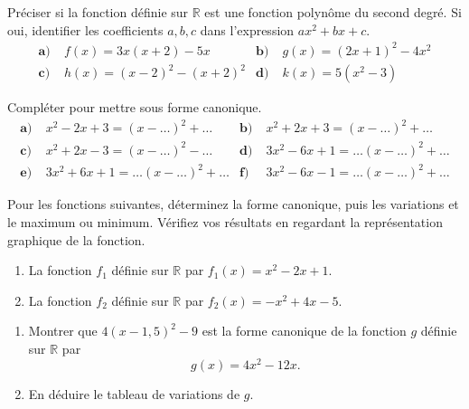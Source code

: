 \documentclass[11pt]{article}
\begin{document}
\begin{exo}
  Préciser si la fonction définie sur $\mathbb{R}$ est une fonction polynôme du
  second degré. Si oui, identifier les coefficients $a, b, c$ dans l'expression
  $ax^2+bx+c$.
  \begin{align*}
    \textbf{a)}&\; f(x) = 3x(x+2)-5x &
    \textbf{b)}&\; g(x) = (2x+1)^2-4x^2 \\
    \textbf{c)}&\; h(x) = (x-2)^2-(x+2)^2 &
    \textbf{d)}&\; k(x) = 5(x^2-3)
  \end{align*}
\end{exo}

\begin{exo}
  Compléter pour mettre sous forme canonique.
  \begin{align*}
    \textbf{a)}&\; x^2-2x+3 = (x-\ldots)^2+\ldots &
    \textbf{b)}&\; x^2+2x+3 = (x-\ldots)^2+\ldots \\
    \textbf{c)}&\; x^2+2x-3 = (x-\ldots)^2-\ldots & 
    \textbf{d)}&\; 3x^2-6x+1 = \ldots(x-\ldots)^2+\ldots \\
    \textbf{e)}&\; 3x^2+6x+1 = \ldots(x-\ldots)^2+\ldots &
    \textbf{f)}&\; 3x^2-6x-1 = \ldots(x-\ldots)^2+\ldots
  \end{align*}
\end{exo}

\begin{exo}
  Pour les fonctions suivantes, déterminez la forme canonique, puis les
  variations et le maximum ou minimum. Vérifiez vos résultats en regardant la
  représentation graphique de la fonction.
  \begin{enumerate}
    \item La fonction $f_1$ définie sur $\mathbb{R}$ par $f_1(x)=x^2-2x+1$.
    \item La fonction $f_2$ définie sur $\mathbb{R}$ par $f_2(x)=-x^2+4x-5$.
  \end{enumerate}
\end{exo}

\begin{exo}
  \begin{enumerate}
    \item Montrer que $4(x-1,5)^2-9$ est la forme canonique de la fonction $g$ définie
  sur $\mathbb{R}$ par
  \[
    g(x) = 4x^2-12x.
  \]
\item En déduire le tableau de variations de $g$.
  \end{enumerate}
\end{exo}
\end{document}
